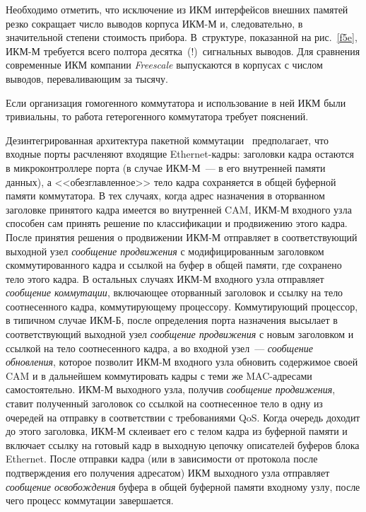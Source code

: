 \begin{multicols}{2}
     Необходимо отметить, что исключение из ИКМ интерфейсов внешних памятей резко 
сокращает чис\-ло выводов корпуса ИКМ-М и, следовательно, в значительной степени 
стоимость прибора. В~структуре, показанной на рис.~\ref{f5e}, ИКМ-М требуется всего 
полтора десятка~(!)\ сигнальных выводов. Для сравнения современные ИКМ компании 
\textit{Freescale} выпускаются в корпусах с числом выводов, переваливающим за тысячу.
     
     Если организация гомогенного коммутатора и использование в ней ИКМ были 
тривиальны, то работа гетерогенного коммутатора требует пояснений.
     
     Дезинтегрированная архитектура пакетной коммутации~\cite{9e} предполагает, что 
входные порты расчленяют входящие Ethernet-кадры: заголовки кадра остаются в 
микроконтроллере порта (в случае ИКМ-М~--- в его внутренней памяти данных), а 
<<обезглавленное>> тело кадра сохраняется в общей буферной памяти коммутатора. В тех 
случаях, когда адрес назначения в оторванном заголовке принятого кадра имеется во 
внутренней CAM, ИКМ-М входного узла способен сам принять решение по классификации 
и продвижению этого кадра. После принятия решения о продвижении ИКМ-М отправляет в 
соответствующий выходной узел \textit{сообщение продвижения} с модифицированным 
заголовком скоммутированного кадра и ссылкой на буфер в общей памяти, где сохранено 
тело этого кадра. В остальных случаях ИКМ-М входного узла отправляет 
\textit{сообщение коммутации}, включающее оторванный заголовок и ссылку на тело 
соотнесенного кадра, коммутирующему процессору. Коммутирующий процессор, в 
типичном случае ИКМ-Б, после определения порта назначения высылает в соответствующий 
выходной узел \textit{сообщение продвижения} с новым заголовком и ссылкой на тело 
соотнесенного кадра, а во входной узел~--- \textit{сообщение обновления}, которое 
позволит ИКМ-М входного узла обновить содержимое своей CAM и в дальнейшем 
коммутировать кадры с теми же MAC-адресами самостоятельно. ИКМ-М выходного узла, 
получив \textit{сообщение продвижения}, ставит полученный заголовок со ссылкой на 
соотнесенное тело в одну из очередей на отправку в соответствии с требованиями QoS. 
Когда очередь доходит до этого заголовка, ИКМ-М склеивает его с телом кадра из буферной 
памяти и включает ссылку на готовый кадр в выходную цепочку описателей буферов блока 
Ethernet. После отправки кадра (или в зависимости от протокола после подтверждения его 
получения адресатом) ИКМ выходного узла отправляет \textit{сообщение освобождения} 
буфера в общей буферной памяти входному узлу, после чего процесс коммутации 
завершается.
     

\end{multicols}
